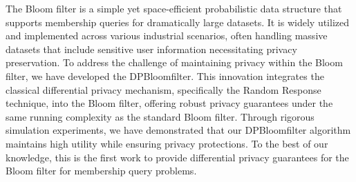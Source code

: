 The Bloom filter is a simple yet space-efficient probabilistic data structure that supports membership queries for dramatically large datasets. It is widely utilized and implemented across various industrial scenarios, often handling massive datasets that include sensitive user information necessitating privacy preservation. To address the challenge of maintaining privacy within the Bloom filter, we have developed the DPBloomfilter. This innovation integrates the classical differential privacy mechanism, specifically the Random Response technique, into the Bloom filter, offering robust privacy guarantees under the same running complexity as the standard Bloom filter. Through rigorous simulation experiments, we have demonstrated that our DPBloomfilter algorithm maintains high utility while ensuring privacy protections. To the best of our knowledge, this is the first work to provide differential privacy guarantees for the Bloom filter for membership query problems.


